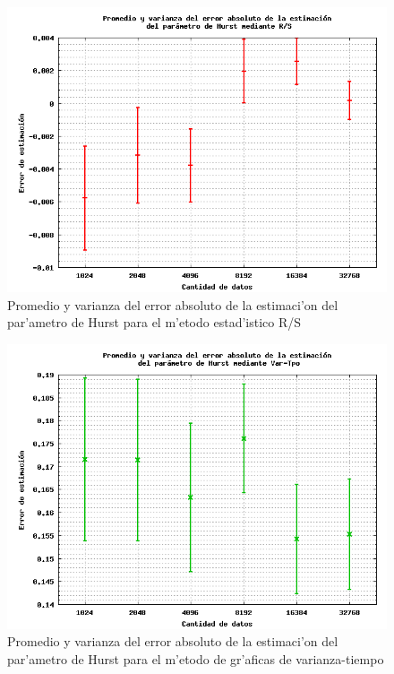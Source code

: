 \begin{figure}[htb]
\centering
\includegraphics[scale=0.45,type=png,ext=.png,read=.png]{figures/abserror-rs}
\caption{Promedio y varianza del error absoluto de la estimaci'on del par'ametro
de Hurst para el m'etodo estad'istico R/S}
\label{fig:abserrrs}
\end{figure}
\begin{figure}[htb]
\centering
\includegraphics[scale=0.45,type=png,ext=.png,read=.png]{figures/abserror-var}
\caption{Promedio y varianza del error absoluto de la estimaci'on del par'ametro
de Hurst para el m'etodo de gr'aficas de varianza-tiempo}
\label{fig:abserrvar}
\end{figure}
